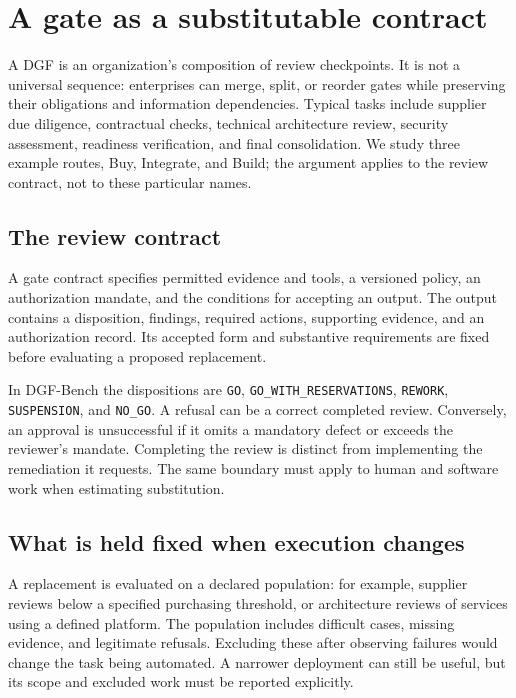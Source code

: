 \section{A gate as a substitutable contract}
\label{sec:contract}

A DGF is an organization's composition of review checkpoints. It is not a universal sequence:
enterprises can merge, split, or reorder gates while preserving their obligations and information
dependencies. Typical tasks include supplier due diligence, contractual checks, technical
architecture review, security assessment, readiness verification, and final consolidation.
We study three example routes, Buy, Integrate, and Build; the argument applies to the review
contract, not to these particular names.



\subsection{The review contract}

\begin{definition}
A gate contract specifies permitted evidence and tools, a versioned policy, an authorization
mandate, and the conditions for accepting an output. The output contains a disposition,
findings, required actions, supporting evidence, and an authorization record. Its accepted
form and substantive requirements are fixed before evaluating a proposed replacement.
\end{definition}

In DGF-Bench the dispositions are \texttt{GO}, \texttt{GO\_WITH\_RESERVATIONS}, \texttt{REWORK},
\texttt{SUSPENSION}, and \texttt{NO\_GO}. A refusal can be a correct completed review. Conversely,
an approval is unsuccessful if it omits a mandatory defect or exceeds the reviewer's mandate.
Completing the review is distinct from implementing the remediation it requests. The same
boundary must apply to human and software work when estimating substitution.

\subsection{What is held fixed when execution changes}

A replacement is evaluated on a declared population: for example, supplier reviews below a
specified purchasing threshold, or architecture reviews of services using a defined platform.
The population includes difficult cases, missing evidence, and legitimate refusals. Excluding
these after observing failures would change the task being automated. A narrower deployment
can still be useful, but its scope and excluded work must be reported explicitly.

